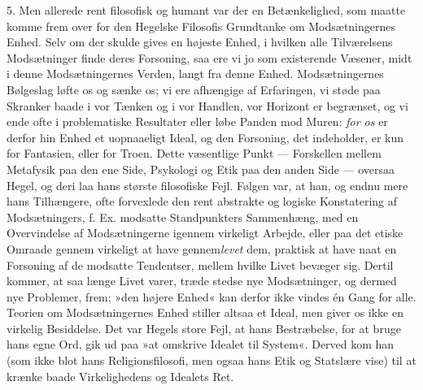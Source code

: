 \documentclass[12pt,a4paper,openany]{book}
\newcommand{\opage}[1]{\marginnote{\footnotesize\textit{[#1]}}}
\begin{document}
5. Men allerede rent filosofisk og humant var der
en Betænkelighed, som maatte komme frem over for den
Hegelske Filosofis Grundtanke om Modsætningernes Enhed.
Selv om der skulde gives en højeste Enhed, i
hvilken alle Tilværelsens Modsætninger finde deres Forsoning,
saa ere vi jo som existerende Væsener, midt i
denne Modsætningernes Verden, langt fra denne Enhed.
Modsætningernes Bølgeslag løfte os og sænke os; vi ere
afhængige af Erfaringen, vi støde paa Skranker baade i
vor Tænken og i vor Handlen, vor Horizont er begrænset,
og vi ende ofte i problematiske Resultater eller løbe
Panden mod Muren: \textit{for os} er derfor hin Enhed et
uopnaaeligt Ideal, og den Forsoning, det indeholder, er
kun for Fantasien, eller for Troen. Dette væsentlige
Punkt --- Forskellen mellem Metafysik paa den ene Side,
Psykologi og Etik paa den anden Side --- oversaa Hegel,
og deri laa hans største filosofiske Fejl. Følgen var, at
han, og endnu mere hans Tilhængere, ofte forvexlede den
rent abstrakte og logiske Konstatering af Modsætningers,
f. Ex. modsatte Standpunkters Sammenhæng, med en
Overvindelse af Modsætningerne igennem virkeligt Arbejde,
eller paa det etiske Omraade gennem virkeligt at
have gennem\textit{levet} dem, praktisk at have naat en Forsoning
af de modsatte Tendentser, mellem hvilke Livet bevæger
sig. Dertil kommer, at saa længe Livet varer,
træde stedse nye Modsætninger, og dermed nye Problemer,
frem; »den højere Enhed« kan derfor ikke vindes én
Gang for alle. Teorien om Modsætningernes Enhed
stiller altsaa et Ideal, men giver os ikke en virkelig Besiddelse.
Det var Hegels store Fejl, at hans Bestræbelse,
\opage{14}for at bruge hans egne Ord, gik ud paa »at omskrive
Idealet til System«. Derved kom han (som ikke blot
hans Religionsfilosofi, men ogsaa hans Etik og Statslære
vise) til at krænke baade Virkelighedens og Idealets Ret.
\end{document}
